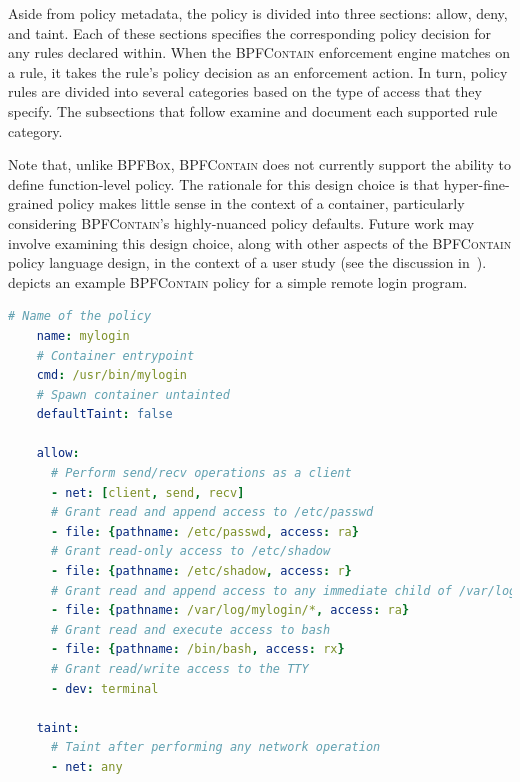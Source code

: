 \documentclass[
  fontsize=12pt,
  titlepage=firstiscover,
  paper=letter,
oneside,
  cleardoublepage=plain,
  parskip=half-,
  DIV=10,
  parindent,
  appendixprefix,
  chapterprefix,
  listof=totoc,
]{scrbook}
\newcommand{\bpfbox}{\textsc{BPFBox}}
\newcommand{\bpfcontain}{\textsc{BPFContain}}
\begin{document}
Aside from policy metadata, the policy is divided into three sections: allow, deny, and
taint. Each of these sections specifies the corresponding policy decision for any rules
declared within. When the \bpfcontain{} enforcement engine matches on a rule, it takes the
rule's policy decision as an enforcement action. In turn, policy rules are divided into
several categories based on the type of access that they specify. The subsections that
follow examine and document each supported rule category.

Note that, unlike \bpfbox{}, \bpfcontain{} does not currently support the ability to
define function-level policy. The rationale for this design choice is that
hyper-fine-grained policy makes little sense in the context of a container, particularly
considering \bpfcontain{}'s highly-nuanced policy defaults. Future work may involve
examining this design choice, along with other aspects of the \bpfcontain{} policy
language design, in the context of a user study (see the discussion
in~).  depicts an example
\bpfcontain{} policy for a simple remote login program.

\begin{lstlisting}[language=yaml, gobble=4,
  caption={[An example \bpfcontain{} policy  written in YAML]
    An example \bpfcontain{} policy for a simple remote login program, written in YAML.
    This example offers a fairly complete idea of the \bpfcontain{} policy language's
    various features.
The reader is encouraged to compare
    this policy with the policy depicted in \Cref{lst:bpfbox-policy-example} on page
    \pageref{lst:bpfbox-policy-example}.
  },
  label={lst:bpfcontain-policy-example}, float]
    # Name of the policy
    name: mylogin
    # Container entrypoint
    cmd: /usr/bin/mylogin
    # Spawn container untainted
    defaultTaint: false

    allow:
      # Perform send/recv operations as a client
      - net: [client, send, recv]
      # Grant read and append access to /etc/passwd
      - file: {pathname: /etc/passwd, access: ra}
      # Grant read-only access to /etc/shadow
      - file: {pathname: /etc/shadow, access: r}
      # Grant read and append access to any immediate child of /var/log/mylogin
      - file: {pathname: /var/log/mylogin/*, access: ra}
      # Grant read and execute access to bash
      - file: {pathname: /bin/bash, access: rx}
      # Grant read/write access to the TTY
      - dev: terminal

    taint:
      # Taint after performing any network operation
      - net: any
\end{lstlisting}
\end{document}
